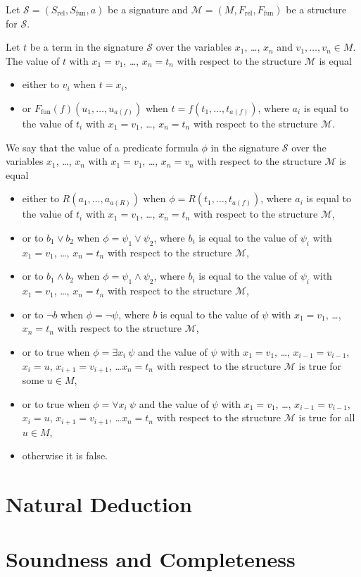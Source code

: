 \begin{definition}
  Let $\mathcal{S} = (S_\mathrm{rel}, S_\mathrm{fun}, a)$ be a signature and
  $\mathcal{M} = (M, F_\mathrm{rel}, F_\mathrm{fun})$ be a structure for
  $\mathcal{S}$.

  Let $t$ be a term in the signature $\mathcal{S}$ over the variables
  $x_1$, \dots, $x_n$ and $v_1, \dots, v_n \in M$.
  The value of $t$ with $x_1 = v_1$, \dots, $x_n = t_n$ with respect to the
  structure $\mathcal{M}$ is equal
  \begin{itemize}
    \item either to $v_i$ when $t = x_i$,
    \item or $F_\mathrm{fun}(f)(u_1, \dots, u_{a(f)})$ when
      $t = f(t_1, \dots, t_{a(f)})$, where $a_i$ is equal to the value of
      $t_i$ with $x_1 = v_1$, \dots, $x_n = t_n$ with respect to the
      structure $\mathcal{M}$.
  \end{itemize}

  We say that the value of a predicate formula $\phi$ in the signature
  $\mathcal{S}$ over the variables $x_1$, \dots, $x_n$ with $x_1 = v_1$, \dots,
  $x_n = v_n$ with respect to the structure $\mathcal{M}$ is equal
  \begin{itemize}
    \item either to $R(a_1, \dots, a_{a(R)})$ when
      $\phi = R(t_1, \dots, t_{a(f)})$, where $a_i$ is equal to the value of
      $t_i$ with $x_1 = v_1$, \dots, $x_n = t_n$ with respect to the
      structure $\mathcal{M}$,
    \item or to $b_1 \lor b_2$ when $\phi = \psi_1 \lor \psi_2$, where $b_i$ is
      equal to the value of $\psi_i$ with $x_1 = v_1$, \dots, $x_n = t_n$ with
      respect to the structure $\mathcal{M}$,
    \item or to $b_1 \land b_2$ when $\phi = \psi_1 \land \psi_2$, where
      $b_i$ is equal to the value of $\psi_i$ with $x_1 = v_1$, \dots, $x_n =
      t_n$ with respect to the structure $\mathcal{M}$,
    \item or to $\lnot b$ when $\phi = \lnot \psi$, where
      $b$ is equal to the value of $\psi$ with $x_1 = v_1$, \dots,
      $x_n = t_n$ with respect to the structure $\mathcal{M}$,
    \item or to true when $\phi = \exists x_i ~ \psi$ and the value of $\psi$
      with $x_1 = v_1$, \dots, $x_{i - 1} = v_{i - 1}$, $x_i = u$, $x_{i + 1} =
      v_{i + 1}$, \dots $x_n = t_n$ with respect to the structure $\mathcal{M}$
      is true for some $u \in M$,
    \item or to true when $\phi = \forall x_i ~ \psi$ and the value of $\psi$
      with $x_1 = v_1$, \dots, $x_{i - 1} = v_{i - 1}$, $x_i = u$, $x_{i + 1} =
      v_{i + 1}$, \dots $x_n = t_n$ with respect to the structure $\mathcal{M}$
      is true for all $u \in M$,
    \item otherwise it is false.
  \end{itemize}
\end{definition}




\section{Natural Deduction}
\section{Soundness and Completeness}
